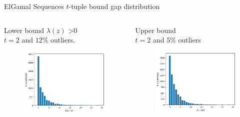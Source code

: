\begin{frame}{ElGamal Sequences $t$-tuple bound gap distribution}
    \begin{columns}
        \begin{column}{0.45\textwidth}
        \begin{center}
            Lower bound $\lambda(z)$ >0\\
            $t =2$ and $12\%$ outliers.
        \end{center}
            \begin{figure}
                \centering
                \includegraphics[width=\textwidth]{figures/LB0t2with012outliers.png}
            \end{figure}
        \end{column}
        \begin{column}{0.45\textwidth}
        \begin{center}
            Upper bound \\
            $t = 2$ and $5\%$ outliers
        \end{center}
            \begin{figure}
                \centering
                \includegraphics[width=\textwidth]{figures/UBt2with005outliers.png}

\end{figure}
\end{column}
\end{columns}
\end{frame}
